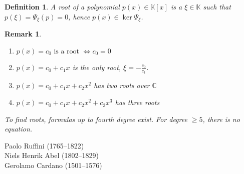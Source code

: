 \documentclass{article}
\newtheorem{definition}{Definition}  \numberwithin{definition}{section}
\newtheorem{remark}{Remark}  \numberwithin{remark}{section}
\begin{document}
\begin{definition}
  A \emph{root of a polynomial} $p(x) \in \mathbb K[x]$ is a $\xi \in \mathbb K$ such that $p(\xi) = \Psi_{\xi}(p) = 0$,
  hence $p(x) \in \ker{\Psi_{\xi}}$.
\end{definition}

\begin{remark}
  \begin{enumerate}
    \item $p(x) = c_0 \text{ is a root } \iff c_0 = 0$
    \item $p(x) = c_0 + c_1 x$ is the only root, $\xi = -\frac{c_0}{c_1}$.
    \item $p(x) = c_0 + c_1 x + c_2 x^2$ has two roots over $\mathbb C$
    \item $p(x) = c_0 + c_1 x + c_2 x^2 + c_3 x^3$ has three roots
  \end{enumerate}

  To find roots, formulas up to fourth degree exist.
  For degree $\geq 5$, there is no equation.
\end{remark}

Paolo Ruffini (1765--1822) \\
Niels Henrik Abel (1802--1829) \\
Gerolamo Cardano (1501--1576)
\end{document}
